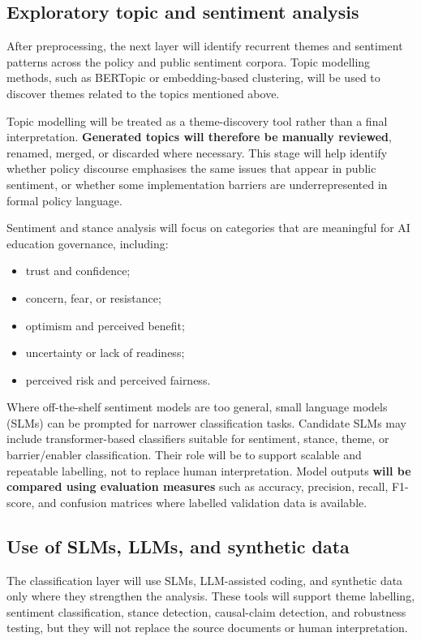 \documentclass{article}
\begin{document}
\subsection{Exploratory topic and sentiment analysis}

After preprocessing, the next layer will identify recurrent themes and sentiment
patterns across the policy and public sentiment corpora. Topic modelling
methods, such as BERTopic or embedding-based clustering, will be used to
discover themes related to the topics mentioned above.

Topic modelling will be treated as a theme-discovery tool rather than a final
interpretation. \textbf{Generated topics will therefore be manually reviewed},
renamed, merged, or discarded where necessary. This stage will help identify whether
policy discourse emphasises the same issues that appear in public sentiment, or
whether some implementation barriers are underrepresented in formal policy language.

Sentiment and stance analysis will focus on categories that are meaningful for
AI education governance, including:

\begin{itemize}[leftmargin=*]
    \item trust and confidence;
    \item concern, fear, or resistance;
    \item optimism and perceived benefit;
    \item uncertainty or lack of readiness;
    \item perceived risk and perceived fairness.
\end{itemize}

Where off-the-shelf sentiment models are too general, small language models
(SLMs) can be prompted for narrower classification tasks. Candidate
SLMs may include transformer-based classifiers suitable for sentiment, stance,
theme, or barrier/enabler classification. Their role will be to support scalable
and repeatable labelling, not to replace human interpretation. Model outputs
\textbf{will be compared using evaluation measures} such as accuracy, precision, recall,
F1-score, and confusion matrices where labelled validation data is available.

\subsection{Use of SLMs, LLMs, and synthetic data}

The classification layer will use SLMs, LLM-assisted coding, and synthetic data
only where they strengthen the analysis. These tools will support theme
labelling, sentiment classification, stance detection, causal-claim detection,
and robustness testing, but they will not replace the source documents or human
interpretation.
\end{document}
